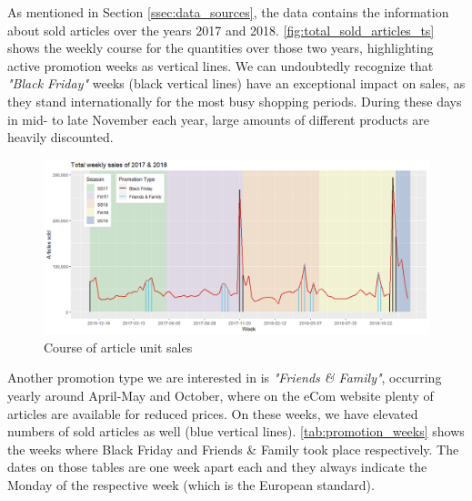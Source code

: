 


As mentioned in Section \ref{ssec:data_sources}, the data contains the information about sold articles over the years 2017 and 2018. \autoref{fig:total_sold_articles_ts} shows the weekly course for the quantities over those two years, highlighting active promotion weeks as vertical lines. We can undoubtedly recognize that \textit{"Black Friday"} weeks (black vertical lines) have an exceptional impact on sales, as they stand internationally for the most busy shopping periods. During these days in mid- to late November each year, large amounts of different products are heavily discounted.
\\

\begin{figure}[H]
\centering
  \includegraphics[width=1\linewidth]{figures/total_sold_articles_ts.png}
  \caption{Course of article unit sales}
  \label{fig:total_sold_articles_ts}
\end{figure}

Another promotion type we are interested in is \textit{"Friends \& Family"}, occurring yearly around April-May and October, where on the eCom website plenty of articles are available for reduced prices. On these weeks, we have elevated numbers of sold articles as well (blue vertical lines). \autoref{tab:promotion_weeks} shows the weeks where Black Friday and Friends \& Family took place respectively. The dates on those tables are one week apart each and they always indicate the Monday of the respective week (which is the European standard).
\\



